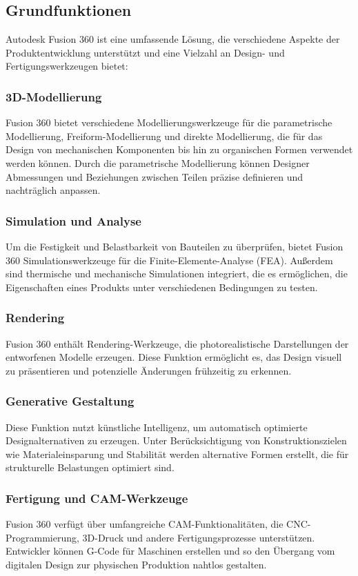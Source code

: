 {\subsection{Grundfunktionen}
Autodesk Fusion 360 ist eine umfassende Lösung, die verschiedene Aspekte der Produktentwicklung unterstützt und eine Vielzahl an Design- und Fertigungswerkzeugen bietet:
\subsubsection*{3D-Modellierung }
Fusion 360 bietet verschiedene Modellierungswerkzeuge für die parametrische Modellierung, Freiform-Modellierung und direkte Modellierung, die für das Design von mechanischen Komponenten bis hin zu organischen Formen verwendet werden können. Durch die parametrische Modellierung können Designer Abmessungen und Beziehungen zwischen Teilen präzise definieren und nachträglich anpassen.\autocite{autodesk_fusion360_features}
\subsubsection*{Simulation und Analyse}
Um die Festigkeit und Belastbarkeit von Bauteilen zu überprüfen, bietet Fusion 360 Simulationswerkzeuge für die Finite-Elemente-Analyse (FEA). Außerdem sind thermische und mechanische Simulationen integriert, die es ermöglichen, die Eigenschaften eines Produkts unter verschiedenen Bedingungen zu testen.\autocite{autodesk_what_is_fusion360}
\subsubsection*{Rendering}
Fusion 360 enthält Rendering-Werkzeuge, die photorealistische Darstellungen der entworfenen Modelle erzeugen. Diese Funktion ermöglicht es, das Design visuell zu präsentieren und potenzielle Änderungen frühzeitig zu erkennen.\autocite{autodesk_fusion360_lessons}
\subsubsection*{Generative Gestaltung}
Diese Funktion nutzt künstliche Intelligenz, um automatisch optimierte Designalternativen zu erzeugen. Unter Berücksichtigung von Konstruktionszielen wie Materialeinsparung und Stabilität werden alternative Formen erstellt, die für strukturelle Belastungen optimiert sind.\autocite{cideon_fusion360_vorteile}
\subsubsection*{Fertigung und CAM-Werkzeuge}
Fusion 360 verfügt über umfangreiche CAM-Funktionalitäten, die CNC-Programmierung, 3D-Druck und andere Fertigungsprozesse unterstützen. Entwickler können G-Code für Maschinen erstellen und so den Übergang vom digitalen Design zur physischen Produktion nahtlos gestalten.\autocite{autodesk_fusion360_lessons}
}
